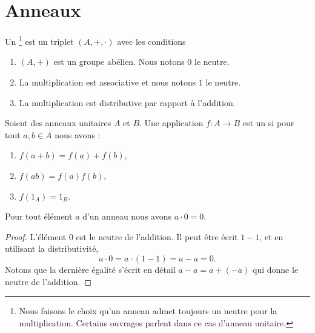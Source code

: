 \section{Anneaux}

\begin{definition}     \label{DefHXJUooKoovob}
    Un \footnote{Nous faisons le choix qu'un anneau admet toujours un neutre pour la multiplication. Certains ouvrages parlent dans ce cas d'anneau unitaire.} est un triplet \( (A,+,\cdot)\) avec les conditions
    \begin{enumerate}
        \item
            \( (A,+)\) est un groupe abélien. Nous notons \( 0\) le neutre.
        \item
            La multiplication est associative et nous notons \( 1\) le neutre.
        \item
            La multiplication est distributive par rapport à l'addition.
    \end{enumerate}
\end{definition}

\begin{definition}        \label{DEFooSPHPooCwjzuz}
    Soient des anneaux unitaires \( A\) et \( B\). Une application \( f\colon A\to B\) est un  si pour tout \( a,b\in A\) nous avons :
    \begin{enumerate}
        \item
            \( f(a+b)=f(a)+f(b)\),
        \item
            \( f(ab)=f(a)f(b)\),
        \item
            \( f(1_A)=1_B\).
    \end{enumerate}
\end{definition}

\begin{lemma}       \label{LEMooVUSMooWisQpD}
    Pour tout élément \( a\) d'un anneau nous avons \( a\cdot 0=0\).
\end{lemma}

\begin{proof}
    L'élément \( 0\) est le neutre de l'addition. Il peut être écrit \( 1-1\), et en utilisant la distributivité,
    \begin{equation}
        a\cdot 0=a\cdot (1-1)=a-a=0.
    \end{equation}
    Notons que la dernière égalité s'écrit en détail \( a-a=a+(-a)\) qui donne le neutre de l'addition.
\end{proof}

